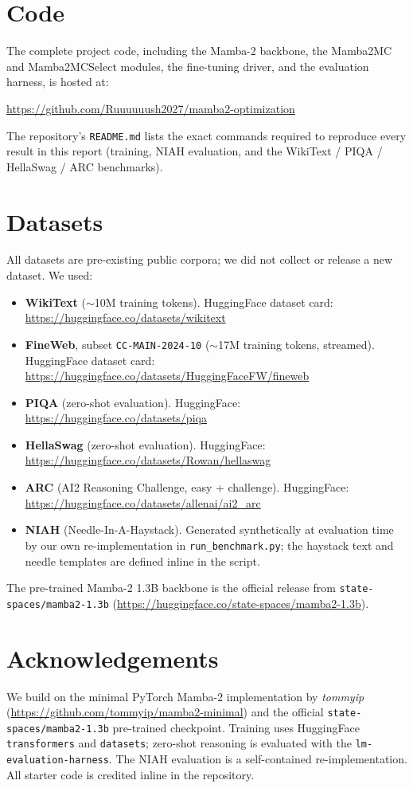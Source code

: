 \documentclass[conference]{IEEEtran}
\begin{document}
\appendices

\section{Code}

The complete project code, including the Mamba-2 backbone, the Mamba2MC and Mamba2MCSelect modules, the fine-tuning driver, and the evaluation harness, is hosted at:

\url{https://github.com/Ruuuuuush2027/mamba2-optimization}

The repository's \texttt{README.md} lists the exact commands required to reproduce every result in this report (training, NIAH evaluation, and the WikiText / PIQA / HellaSwag / ARC benchmarks).

\section{Datasets}

All datasets are pre-existing public corpora; we did not collect or release a new dataset. We used:

\begin{itemize}
    \item \textbf{WikiText} ($\sim$10M training tokens). HuggingFace dataset card: \url{https://huggingface.co/datasets/wikitext}
    \item \textbf{FineWeb}, subset \texttt{CC-MAIN-2024-10} ($\sim$17M training tokens, streamed). HuggingFace dataset card: \url{https://huggingface.co/datasets/HuggingFaceFW/fineweb}
    \item \textbf{PIQA} (zero-shot evaluation). HuggingFace: \url{https://huggingface.co/datasets/piqa}
    \item \textbf{HellaSwag} (zero-shot evaluation). HuggingFace: \url{https://huggingface.co/datasets/Rowan/hellaswag}
    \item \textbf{ARC} (AI2 Reasoning Challenge, easy + challenge). HuggingFace: \url{https://huggingface.co/datasets/allenai/ai2_arc}
    \item \textbf{NIAH} (Needle-In-A-Haystack). Generated synthetically at evaluation time by our own re-implementation in \texttt{run\_benchmark.py}; the haystack text and needle templates are defined inline in the script.
\end{itemize}

The pre-trained Mamba-2 1.3B backbone is the official release from \texttt{state-spaces/mamba2-1.3b} (\url{https://huggingface.co/state-spaces/mamba2-1.3b}).

\section{Acknowledgements}

We build on the minimal PyTorch Mamba-2 implementation by \textit{tommyip} (\url{https://github.com/tommyip/mamba2-minimal}) and the official \texttt{state-spaces/mamba2-1.3b} pre-trained checkpoint. Training uses HuggingFace \texttt{transformers} and \texttt{datasets}; zero-shot reasoning is evaluated with the \texttt{lm-evaluation-harness}. The NIAH evaluation is a self-contained re-implementation. All starter code is credited inline in the repository.
\end{document}
